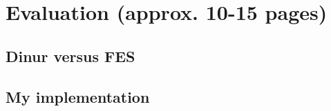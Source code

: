 \section{Evaluation (approx. 10-15 pages)} \label{sec:eval}
\subsection{Dinur versus FES}

\subsection{My implementation}
% 

\newpage